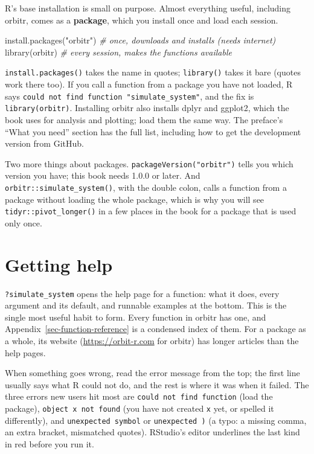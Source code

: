 \documentclass[
  10.5pt,
  letterpaper,
]{scrbook}
\newenvironment{Shaded}{\begin{snugshade}}{\end{snugshade}}
\newcommand{\CommentTok}[1]{\textcolor[rgb]{0.00,0.00,0.00}{\textit{#1}}}
\newcommand{\FunctionTok}[1]{\textcolor[rgb]{0.00,0.00,0.00}{#1}}
\newcommand{\NormalTok}[1]{\textcolor[rgb]{0.00,0.00,0.00}{#1}}
\newcommand{\StringTok}[1]{\textcolor[rgb]{0.00,0.00,0.00}{#1}}
\theoremstyle{definition}
\theoremstyle{plain}
\theoremstyle{remark}
\begin{document}
R's base installation is small on purpose. Almost everything useful,
including orbitr, comes as a \textbf{package}, which you install once
and load each session.

\begin{Shaded}
\begin{Highlighting}[]
\FunctionTok{install.packages}\NormalTok{(}\StringTok{"orbitr"}\NormalTok{)      }\CommentTok{\# once, downloads and installs (needs internet)}
\FunctionTok{library}\NormalTok{(orbitr)                 }\CommentTok{\# every session, makes the functions available}
\end{Highlighting}
\end{Shaded}

\texttt{install.packages()} takes the name in quotes; \texttt{library()}
takes it bare (quotes work there too). If you call a function from a
package you have not loaded, R says
\texttt{could\ not\ find\ function\ "simulate\_system"}, and the fix is
\texttt{library(orbitr)}. Installing orbitr also installs dplyr and
ggplot2, which the book uses for analysis and plotting; load them the
same way. The preface's ``What you need'' section has the full list,
including how to get the development version from GitHub.

Two more things about packages. \texttt{packageVersion("orbitr")} tells
you which version you have; this book needs 1.0.0 or later. And
\texttt{orbitr::simulate\_system()}, with the double colon, calls a
function from a package without loading the whole package, which is why
you will see \texttt{tidyr::pivot\_longer()} in a few places in the book
for a package that is used only once.

\section{Getting help}\label{getting-help}

\texttt{?simulate\_system} opens the help page for a function: what it
does, every argument and its default, and runnable examples at the
bottom. This is the single most useful habit to form. Every function in
orbitr has one, and Appendix~\ref{sec-function-reference} is a condensed
index of them. For a package as a whole, its website
(\url{https://orbit-r.com} for orbitr) has longer articles than the help
pages.

When something goes wrong, read the error message from the top; the
first line usually says what R could not do, and the rest is where it
was when it failed. The three errors new users hit most are
\texttt{could\ not\ find\ function} (load the package),
\texttt{object\ \textquotesingle{}x\textquotesingle{}\ not\ found} (you
have not created \texttt{x} yet, or spelled it differently), and
\texttt{unexpected\ symbol} or
\texttt{unexpected\ \textquotesingle{})\textquotesingle{}} (a typo: a
missing comma, an extra bracket, mismatched quotes). RStudio's editor
underlines the last kind in red before you run it.
\end{document}
